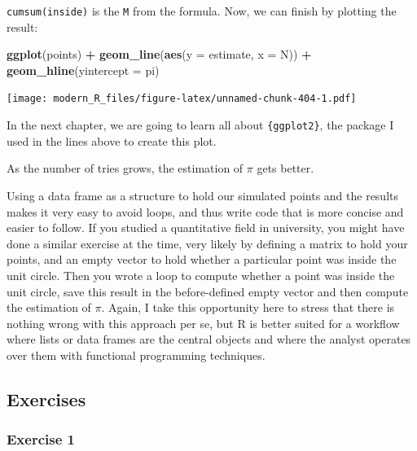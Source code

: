 \documentclass[]{gitbook}
\newenvironment{Shaded}{\begin{snugshade}}{\end{snugshade}}
\newcommand{\DataTypeTok}[1]{\textcolor[rgb]{0.13,0.29,0.53}{#1}}
\newcommand{\KeywordTok}[1]{\textcolor[rgb]{0.13,0.29,0.53}{\textbf{#1}}}
\newcommand{\NormalTok}[1]{#1}
\newcommand{\OperatorTok}[1]{\textcolor[rgb]{0.81,0.36,0.00}{\textbf{#1}}}
\newcommand{\StringTok}[1]{\textcolor[rgb]{0.31,0.60,0.02}{#1}}
\begin{document}
\texttt{cumsum(inside)} is the \texttt{M} from the formula. Now, we can finish by plotting the result:

\begin{Shaded}
\begin{Highlighting}[]
\KeywordTok{ggplot}\NormalTok{(points) }\OperatorTok{+}
\StringTok{    }\KeywordTok{geom_line}\NormalTok{(}\KeywordTok{aes}\NormalTok{(}\DataTypeTok{y =}\NormalTok{ estimate, }\DataTypeTok{x =}\NormalTok{ N)) }\OperatorTok{+}
\StringTok{    }\KeywordTok{geom_hline}\NormalTok{(}\DataTypeTok{yintercept =}\NormalTok{ pi)}
\end{Highlighting}
\end{Shaded}

\texttt{[image: modern\_R\_files/figure-latex/unnamed-chunk-404-1.pdf]}

In the next chapter, we are going to learn all about \texttt{\{ggplot2\}}, the package I used in the lines
above to create this plot.

As the number of tries grows, the estimation of \(\pi\) gets better.

Using a data frame as a structure to hold our simulated points and the results makes it very easy
to avoid loops, and thus write code that is more concise and easier to follow.
If you studied a quantitative field in university, you might have done a similar exercise at the
time, very likely by defining a matrix to hold your points, and an empty vector to hold whether a
particular point was inside the unit circle. Then you wrote a loop to compute whether
a point was inside the unit circle, save this result in the before-defined empty vector and then
compute the estimation of \(\pi\). Again, I take this opportunity here to stress that there is nothing
wrong with this approach per se, but R is better suited for a workflow where lists or data frames
are the central objects and where the analyst operates over them with functional programming techniques.

\hypertarget{exercises-2}{%
\subsection{Exercises}\label{exercises-2}}

\hypertarget{exercise-1-2}{%
\subsubsection*{Exercise 1}\label{exercise-1-2}}
\end{document}
